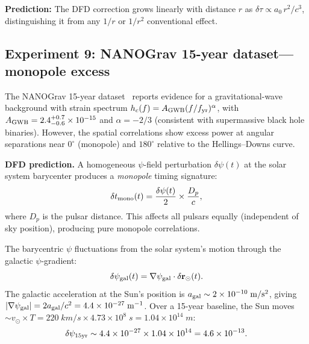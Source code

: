 \documentclass[aps,prd,twocolumn,superscriptaddress,nofootinbib,longbibliography]{revtex4-2}
\begin{document}
\textbf{Prediction:} The DFD correction grows linearly with distance
$r$ as $\delta\tau \propto a_0\,r^2/c^3$, distinguishing it from any
$1/r$ or $1/r^2$ conventional effect.

\subsection{Experiment 9: NANOGrav 15-year dataset---monopole excess}\label{sec:NANOGrav}

The NANOGrav 15-year dataset~\cite{NANOGrav2023} reports evidence for a
gravitational-wave background with strain spectrum
$h_c(f) = A_{\rm GWB}(f/f_{\rm yr})^{\alpha}$, with
$A_{\rm GWB} = 2.4^{+0.7}_{-0.6}\times10^{-15}$ and $\alpha = -2/3$
(consistent with supermassive black hole binaries). However, the spatial
correlations show excess power at angular separations near $0^\circ$
(monopole) and $180^\circ$ relative to the Hellings--Downs curve.

\textbf{DFD prediction.} A homogeneous $\psi$-field perturbation
$\delta\psi(t)$ at the solar system barycenter produces a \emph{monopole}
timing signature:
\begin{equation}
\delta t_{\rm mono}(t) = \frac{\delta\psi(t)}{2}\times\frac{D_p}{c},
\end{equation}
where $D_p$ is the pulsar distance. This affects all pulsars equally
(independent of sky position), producing pure monopole correlations.

The barycentric $\psi$ fluctuations from the solar system's motion
through the galactic $\psi$-gradient:
\begin{equation}
\delta\psi_{\rm gal}(t) = \nabla\psi_{\rm gal}\cdot\delta\mathbf{r}_\odot(t).
\end{equation}
The galactic acceleration at the Sun's position is $a_{\rm gal} \sim 2\times10^{-10}\;\si{m/s^2}$,
giving $|\nabla\psi_{\rm gal}| = 2a_{\rm gal}/c^2 = 4.4\times10^{-27}\;\si{m^{-1}}$.
Over a 15-year baseline, the Sun moves $\sim v_\odot\times T = 220\;\si{km/s}\times
4.73\times10^8\;\si{s} = 1.04\times10^{14}\;\si{m}$:
\begin{equation}
\delta\psi_{\rm 15yr} \sim 4.4\times10^{-27}\times 1.04\times10^{14}
= 4.6\times10^{-13}.
\end{equation}
\end{document}
